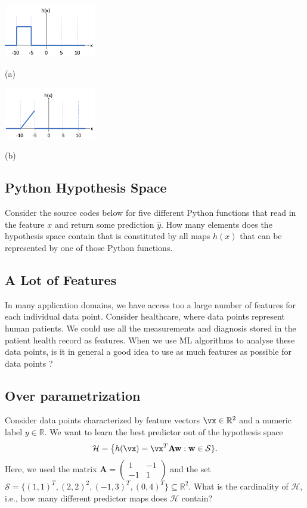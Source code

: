 \documentclass[12pt]{report}
\begin{document}
\begin{minipage}{.5\textwidth} %
\includegraphics[width=4cm]{PiecewiseFun1.png}

(a)
\end{minipage} %
\begin{minipage}{.5\textwidth} %
	\includegraphics[width=4cm]{PiecewiseFun2.png}
	
(b)
\end{minipage}
 
 \subsection{Python Hypothesis Space}
 \label{ex_2_3}
 Consider the source codes below for five different Python functions that read 
 in the feature $x$ and return some prediction $\hat{y}$. How many elements 
 does the hypothesis space contain that is constituted by all maps $h(x)$ that 
 can be represented by one of those Python functions. 
 
  \subsection{A Lot of Features}
 \label{ex_2_toomanyfeatures}
In many application domains, we have access too a large number of features for 
each individual data point. Consider healthcare, where data points represent 
human patients. We could use all the measurements and diagnosis stored in 
the patient health record as features. When we use ML algorithms to 
analyse these data points, is it in general a good idea to use as much 
features as possible for data points ? 
 
  \subsection{Over parametrization}
 \label{ex_2_overparm}
Consider data points characterized by feature vectors $\vx \in \mathbb{R}^{2}$ and 
a numeric label $y \in \mathbb{R}$. We want to learn the best predictor out of the hypothesis space 
$$ \mathcal{H} = \big\{ h(\vx) = \vx^{T} \mathbf{A} \mathbf{w}: \mathbf{w} \in \mathcal{S} \}. $$
Here, we used the matrix $\mathbf{A} = \begin{pmatrix} 1 & -1 \\ -1 & 1 \end{pmatrix}$ and 
the set $\mathcal{S} = \big\{ (1,1)^{T}, (2,2)^{2}, (-1,3)^{T}, (0,4)^{T} \big\} \subseteq \mathbb{R}^{2}$. 
What is the cardinality of $\mathcal{H}$, i.e., how many different predictor maps 
does $\mathcal{H}$ contain?
 
\end{document}
